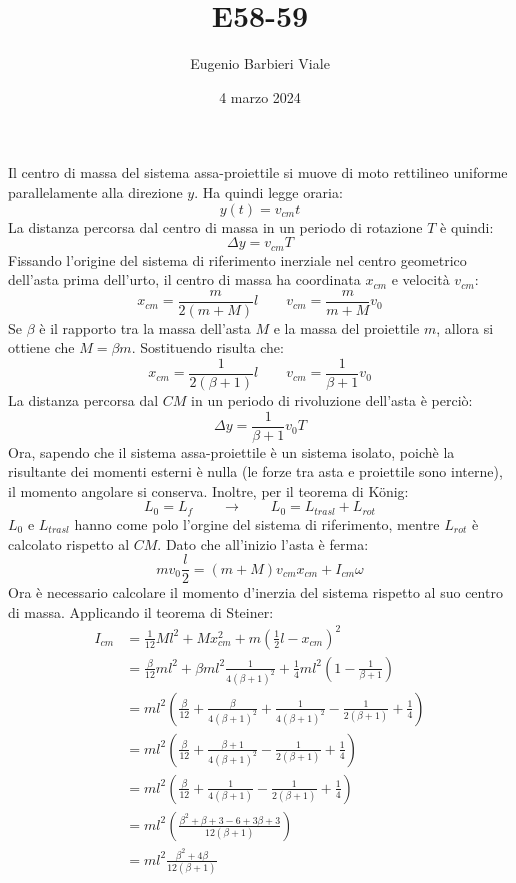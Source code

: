 \documentclass[]{article}
\title{E58-59}
\author{Eugenio Barbieri Viale}
\date{4 marzo 2024}
\begin{document}
\maketitle

Il centro di massa del sistema assa-proiettile si muove di moto rettilineo uniforme parallelamente alla direzione $y$. Ha quindi legge oraria:
$$y(t)=v_{cm}t$$
La distanza percorsa dal centro di massa in un periodo di rotazione $T$ è quindi:
$$\Delta y=v_{cm}T$$
Fissando l'origine del sistema di riferimento inerziale nel centro geometrico dell'asta prima dell'urto, il centro di massa ha coordinata $x_{cm}$ e velocità $v_{cm}$:
$$x_{cm}=\frac{m}{2(m+M)}l \hspace{2em} v_{cm}=\frac{m}{m+M}v_0$$
Se $\beta$ è il rapporto tra la massa dell'asta $M$ e la massa del proiettile $m$, allora si ottiene che $M=\beta m$. Sostituendo risulta che:
$$x_{cm}=\frac{1}{2(\beta+1)}l \hspace{2em} v_{cm}=\frac{1}{\beta+1}v_0$$
La distanza percorsa dal $CM$ in un periodo di rivoluzione dell'asta è perciò:
$$\Delta y=\frac{1}{\beta+1}v_0 T$$
Ora, sapendo che il sistema assa-proiettile è un sistema isolato, poichè la risultante dei momenti esterni è nulla (le forze tra asta e proiettile sono interne), il momento angolare si conserva. Inoltre, per il teorema di König:
$$L_0=L_f \hspace{2em} \rightarrow \hspace{2em} L_0=L_{trasl}+L_{rot}$$
$L_0$ e $L_{trasl}$ hanno come polo l'orgine del sistema di riferimento, mentre $L_{rot}$ è calcolato rispetto al $CM$. Dato che all'inizio l'asta è ferma:
$$mv_0\frac{l}{2}=(m+M)v_{cm}x_{cm}+I_{cm}\omega$$
Ora è necessario calcolare il momento d'inerzia del sistema rispetto al suo centro di massa. Applicando il teorema di Steiner:
\begin{align}
	I_{cm} &= \frac{1}{12}Ml^2 + Mx_{cm}^2 + m(\frac{1}{2}l-x_{cm})^2 \\
		   &= \frac{\beta}{12}ml^2 + \beta ml^2\frac{1}{4(\beta+1)^2} + \frac{1}{4}ml^2(1-\frac{1}{\beta+1}) \\
		   &= ml^2\left(\frac{\beta}{12}+\frac{\beta}{4(\beta+1)^2}+\frac{1}{4(\beta+1)^2}-\frac{1}{2(\beta+1)}+\frac{1}{4}\right) \\
		   &= ml^2\left(\frac{\beta}{12}+\frac{\beta+1}{4(\beta+1)^2}-\frac{1}{2(\beta+1)}+\frac{1}{4}\right) \\
		   &= ml^2\left(\frac{\beta}{12}+\frac{1}{4(\beta+1)}-\frac{1}{2(\beta+1)}+\frac{1}{4}\right) \\
		   &= ml^2\left(\frac{\beta^2+\beta+3-6+3\beta+3}{12(\beta+1)}\right) \\
		   &= ml^2\frac{\beta^2+4\beta}{12(\beta+1)}
\end{align}
\end{document}
